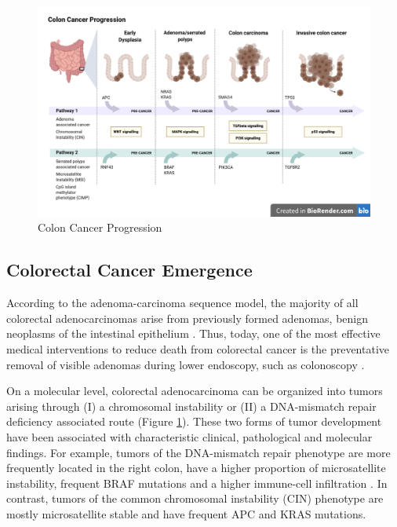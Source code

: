 \begin{flushleft}
\begin{figure}[h]
\centering
\includegraphics[scale=.35]{figures/colon_cancer_progression.png}
\caption{Colon Cancer Progression}
\label{colon_cancer_progression}
\end{figure}

\subsection{Colorectal Cancer Emergence}
According to the adenoma-carcinoma sequence model, the majority of all colorectal adenocarcinomas arise from previously formed adenomas, benign neoplasms of the intestinal epithelium \cite{Cho1992}. Thus, today, one of the most effective medical interventions to reduce death from colorectal cancer is the preventative removal of visible adenomas during lower endoscopy, such as colonoscopy \cite{Nishihara2013Long-TermEndoscopy}.\par

On a molecular level, colorectal adenocarcinoma can be organized into tumors arising through (I) a chromosomal instability or (II) a DNA-mismatch repair deficiency associated route \cite{Markowitz2009} (Figure \ref{colon_cancer_progression}). These two forms of tumor development have been associated with characteristic clinical, pathological and molecular findings. For example, tumors of the DNA-mismatch repair phenotype are more frequently located in the right colon, have a higher proportion of microsatellite instability, frequent BRAF mutations and a higher immune-cell infiltration \cite{Markowitz2009}. In contrast, tumors of the common chromosomal instability (CIN) phenotype are mostly microsatellite stable and have frequent APC and KRAS mutations. \par 


\end{flushleft}
